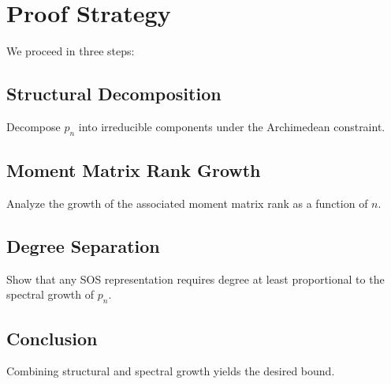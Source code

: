 \section{Proof Strategy}

We proceed in three steps:

\subsection{Structural Decomposition}
Decompose $p_n$ into irreducible components 
under the Archimedean constraint.

\subsection{Moment Matrix Rank Growth}
Analyze the growth of the associated moment matrix rank 
as a function of $n$.

\subsection{Degree Separation}
Show that any SOS representation requires degree 
at least proportional to the spectral growth of $p_n$.

\subsection{Conclusion}
Combining structural and spectral growth yields the desired bound.
